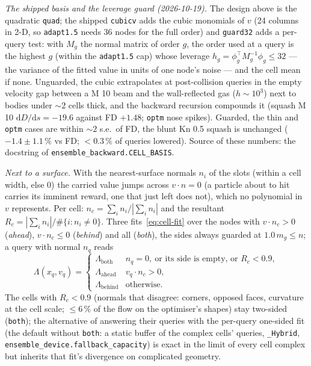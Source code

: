 \documentclass[11pt,a4paper]{article}
\numberwithin{equation}{section}
\newcommand{\code}[1]{\texttt{#1}}
\newcommand{\Lam}{\Lambda}
\newcommand{\dd}{\mathrm{d}}
\begin{document}
\emph{The shipped basis and the leverage guard (2026-10-19).}  The design above is the quadratic \code{quad}; the
shipped \code{cubicv} adds the cubic monomials of $v$ (24 columns in 2-D, so \code{adapt1.5} needs 36 nodes for the full
order) and \code{guard32} adds a per-query test: with $M_g$ the normal matrix of order $g$, the order used at a query is
the highest $g$ (within the \code{adapt1.5} cap) whose leverage $h_g = \phi_g^\top M_g^{-1}\phi_g \le 32$ --- the variance
of the fitted value in units of one node's noise --- and the cell mean if none.  Unguarded, the cubic extrapolates at
post-collision queries in the empty velocity gap between a M 10 beam and the wall-reflected gas ($h\sim10^3$) next to
bodies under $\sim2$ cells thick, and the backward recursion compounds it (squash M 10 $\dd D/\dd s = -19.6$ against FD
$+1.48$; \code{optm} nose spikes).  Guarded, the thin and \code{optm} cases are within $\sim2$ s.e.\ of FD, the blunt Kn 0.5
squash is unchanged ($-1.4\pm1.1\,\%$ vs FD; $<0.3\,\%$ of queries lowered).  Source of these numbers:
the docstring of \code{ensemble\_backward.CELL\_BASIS}.

\emph{Next to a surface.}  With the nearest-surface normals $n_i$ of the slots (within a
cell width, else $0$) the carried value jumps across $v\cdot n = 0$ (a particle about to
hit carries its imminent reward, one that just left does not), which no polynomial in $v$
represents.  Per cell: $n_c = \sum_i n_i / |\sum_i n_i|$ and the resultant
$R_c = |\sum_i n_i| / \#\{i : n_i \ne 0\}$.  Three fits~\eqref{eq:cell-fit} over the nodes with
$v\cdot n_c > 0$ (\emph{ahead}), $v \cdot n_c \le 0$ (\emph{behind}) and all (\emph{both}), the
sides always guarded at $1.0\,m_g \le n$; a query with normal $n_q$ reads
\begin{equation}
\label{eq:cell-split}
\Lam(x_q, v_q) = \begin{cases}
\Lam_{\mathrm{both}} & n_q = 0,\ \text{or its side is empty, or } R_c < 0.9,\\
\Lam_{\mathrm{ahead}} & v_q\cdot n_c > 0,\\
\Lam_{\mathrm{behind}} & \text{otherwise.}
\end{cases}
\end{equation}
The cells with $R_c < 0.9$ (normals that disagree: corners, opposed faces, curvature at the cell
scale; $\le 6\,\%$ of the flow on the optimiser's shapes) stay two-sided (\code{both}); the
alternative of answering their queries with the per-query one-sided fit (the default without
\code{both}: a static buffer of the complex cells' queries, \code{\_Hybrid},
\code{ensemble\_device.fallback\_capacity}) is exact in the limit of every cell complex
but inherits that fit's divergence on complicated geometry.
\end{document}
